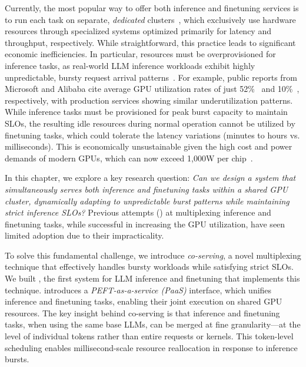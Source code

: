 Currently, the most popular way to offer both inference and finetuning services is to run each task on separate, {\em dedicated} clusters~\cite{weng2022mlaas,gao2022deep,chen2023deepboot}, which exclusively use hardware resources through specialized systems optimized primarily for latency and throughput, respectively. While straightforward, this practice leads to significant economic inefficiencies. In particular, resources must be overprovisioned for inference tasks, as real-world LLM inference workloads exhibit highly unpredictable, bursty request arrival patterns~\cite{wang2024towards}. For example, public reports from Microsoft and Alibaba cite average GPU utilization rates of just 52\%~\cite{lithos2025} and 10\%~\cite{lithos2025}, respectively, with production services showing similar underutilization patterns. While inference tasks must be provisioned for peak burst capacity to maintain SLOs, the resulting idle resources during normal operation cannot be utilized by finetuning tasks, which could tolerate the latency variations (minutes to hours vs. milliseconds). This is economically unsustainable given the high cost and power demands of modern GPUs, which can now exceed 1,000W per chip~\cite{lithos2025}.

In this chapter, we explore a key research question: {\em Can we design a system that {\em simultaneously} serves both inference and finetuning tasks within a shared GPU cluster, dynamically adapting to unpredictable burst patterns while maintaining strict inference SLOs?}
Previous attempts () at multiplexing inference and finetuning tasks, while successful in increasing the GPU utilization, have seen limited adoption due to their impracticality.

To solve this fundamental challenge, we introduce \textit{co-serving}, a novel multiplexing technique that effectively handles bursty workloads while satisfying strict SLOs. We built \FlexLLM, the first system for LLM inference and finetuning that implements this technique. \FlexLLM introduces a \textit{PEFT-as-a-service (PaaS)} interface, which unifies inference and finetuning tasks, enabling their joint execution on shared GPU resources.
The key insight behind co-serving is that inference and finetuning tasks, when using the same base LLMs, can be merged at fine granularity---at the level of individual tokens rather than entire requests or kernels. This token-level scheduling enables millisecond-scale resource reallocation in response to inference bursts.

